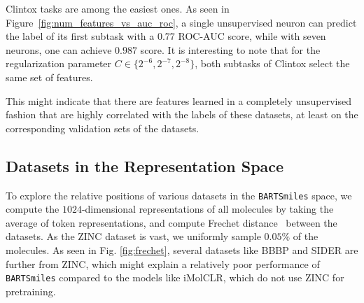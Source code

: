 \documentclass{article} %
\newcommand{\MODEL}{\texttt{BARTSmiles}}
\begin{document}
Clintox tasks are among the easiest ones. As seen in Figure~\ref{fig:num_features_vs_auc_roc}, a single unsupervised neuron can predict the label of its first subtask with a $0.77$ ROC-AUC score, while with seven neurons, one can achieve $0.987$ score. It is interesting to note that for the regularization parameter $C \in \{2^{-6},2^{-7},2^{-8}\} $, both subtasks of Clintox select the same set of features.

This might indicate that there are features learned in a completely unsupervised fashion that are highly correlated with the labels of these datasets, at least on the corresponding validation sets of the datasets.


\subsection{Datasets in the Representation Space}
\label{section:dataset_rep_space}




To explore the relative positions of various datasets in the \MODEL{} space, we compute the $1024$-dimensional representations of all molecules by taking the average of token representations, and compute Frechet distance~\citep{FrechetChemnet} between the datasets. As the ZINC dataset is vast, we uniformly sample $0.05\%$ of the molecules. As seen in Fig. \ref{fig:frechet}, several datasets like BBBP and SIDER are further from ZINC, which might explain a relatively poor performance of \MODEL{} compared to the models like iMolCLR, which do not use ZINC for pretraining. 
\end{document}
